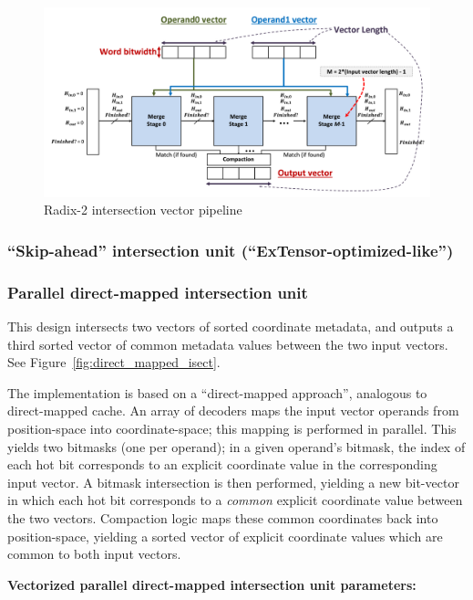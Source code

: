 \begin{figure}[H]
    \centering
    \includegraphics[width=\linewidth]{figures/two_finger_merge_pipeline.png}
    \caption{Radix-2 intersection vector pipeline}
    \label{fig:radix_2_vector pipeline}
\end{figure}

\subsubsection{``Skip-ahead'' intersection unit (``ExTensor-optimized-like'')}

\subsubsection{Parallel direct-mapped intersection unit}

This design intersects two vectors of sorted coordinate metadata, and outputs a third sorted vector of common metadata values between the two input vectors. See Figure~\ref{fig:direct_mapped_isect}.

The implementation is based on a ``direct-mapped approach'', analogous to direct-mapped cache. An array of decoders maps the input vector operands from position-space into coordinate-space; this mapping is performed in parallel. This yields two bitmasks (one per operand); in a given operand's bitmask, the index of each hot bit corresponds to an explicit coordinate value in the corresponding input vector. A bitmask intersection is then performed, yielding a new bit-vector in which each hot bit corresponds to a \textit{common} explicit coordinate value between the two vectors. Compaction logic maps these common coordinates back into position-space, yielding a sorted vector of explicit coordinate values which are common to both input vectors.

\textbf{Vectorized parallel direct-mapped intersection unit parameters:}

